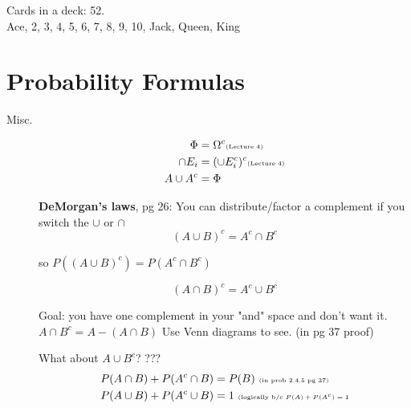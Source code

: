 
Cards in a deck: 52.  \hfill \\
Ace, 2, 3, 4, 5, 6, 7, 8, 9, 10, Jack, Queen, King \hfill \\


\section{Probability Formulas}

\begin{description}
	\item[Misc.] 
		\begin{align*}
		\Phi &= \Omega^c   \mbox{\tiny{(Lecture 4)}}  \\
		\cap E_i &= (\cup E_i^c)^c       \mbox{\tiny{(Lecture 4)}}  \\
		A \cup A^{c} &= \Phi  
		\end{align*}

		
		\textbf{DeMorgan's laws}, pg 26:  You can distribute/factor a complement if you switch the $\cup$ or $\cap$ \\
		\[  (A \cup B)^c = A^c \cap B^c  \]
		\begin{center} \tiny{so $P((A \cup B)^c) = P(A^c \cap B^c)$}   \end{center}  
		\[   (A \cap B)^c = A^c \cup B^c  \]
		
		Goal: you have one complement in your "and" space and don't want it.  $A \cap B^c = A -(A \cap B)$  Use Venn diagrams to see.   (in pg 37 proof)
		
		What about $A \cup B^c$?  ???
		\hfill \\
		\begin{align*}
		P(A \cap B) + P(A^c \cap B) &= P(B)  \mbox{   \tiny{(in prob 2.4.5 pg 37)}}   \\
		P(A \cup B) + P(A^c \cup B) &= 1  \mbox{   \tiny{(logically b/c $P(A) + P(A^c) = 1$}}  \\
		\end{align*}
		
\end{description}

